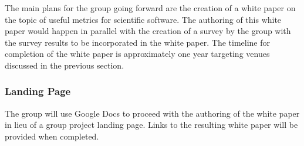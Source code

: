 The main plans for the group going forward are the creation of a white paper on the topic of useful metrics for scientific software.  The authoring of this white paper would happen in parallel with the creation of a survey by the group with the survey results to be incorporated in the white paper.  The timeline for completion of the white paper is approximately one year targeting venues discussed in the previous section.

\subsubsection{Landing Page}

The group will use Google Docs to proceed with the authoring of the white paper in lieu of a group project landing page.  Links to the resulting white paper will be provided when completed. 
